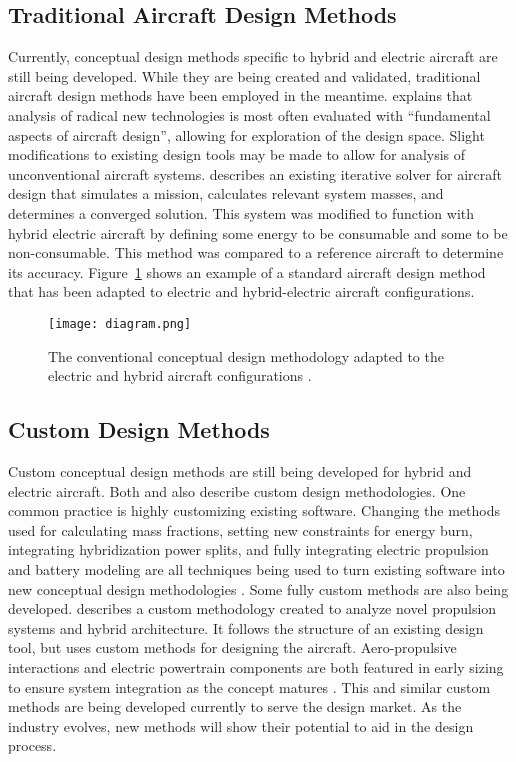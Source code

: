 \documentclass[journal]{new-aiaa}
\begin{document}
\subsection{Traditional Aircraft Design Methods}
Currently, conceptual design methods specific to hybrid and electric aircraft are still being developed. While they are
being created and validated, traditional aircraft design methods have been employed in the meantime.
\citeauthor{sziroczak2020} explains that analysis of radical new technologies is most often evaluated with ``fundamental
aspects of aircraft design'', allowing for exploration of the design space. Slight modifications to existing design
tools may be made to allow for analysis of unconventional aircraft systems. \citeauthor{finger2020} describes an
existing iterative solver for aircraft design that simulates a mission, calculates relevant system masses, and
determines a converged solution. This system was modified to function with hybrid electric aircraft by defining some
energy to be consumable and some to be non-consumable. This method was compared to a reference aircraft to determine its
accuracy. Figure~\ref{fig:diagram} shows an example of a standard aircraft design method that has been adapted to
electric and hybrid-electric aircraft configurations.
\begin{figure}
    \centering
    \texttt{[image: diagram.png]}
    \caption{The conventional conceptual design methodology adapted to the electric and hybrid aircraft configurations \cite{sziroczak2020}.}
    \label{fig:diagram}
\end{figure}

\subsection{Custom Design Methods}
Custom conceptual design methods are still being developed for hybrid and electric aircraft. Both
\citeauthor{sziroczak2020} and \citeauthor{finger2020} also describe custom design methodologies. One common practice is
highly customizing existing software. Changing the methods used for calculating mass fractions, setting new constraints
for energy burn, integrating hybridization power splits, and fully integrating electric propulsion and battery modeling
are all techniques being used to turn existing software into new conceptual design methodologies \cite{sziroczak2020}.
Some fully custom methods are also being developed. \citeauthor{finger2020} describes a custom methodology created to
analyze novel propulsion systems and hybrid architecture. It follows the structure of an existing design tool, but uses
custom methods for designing the aircraft. Aero-propulsive interactions and electric powertrain components are both
featured in early sizing to ensure system integration as the concept matures \cite{finger2020}. This and similar custom
methods are being developed currently to serve the design market. As the industry evolves, new methods will show their
potential to aid in the design process.
\end{document}
